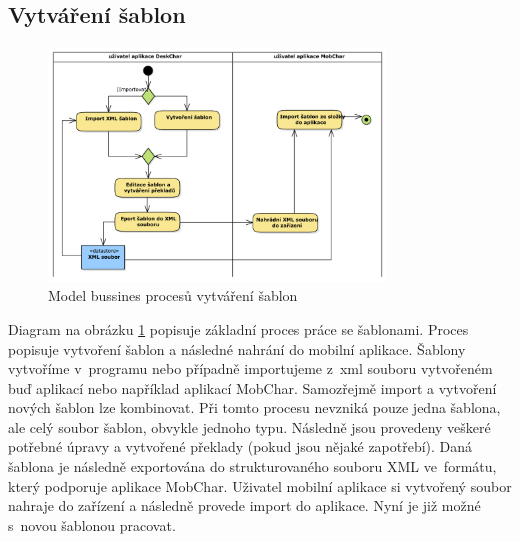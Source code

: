 \documentclass[thesis=B,czech]{resources/FITthesis}[2012/06/26]
\begin{document}
\subsection{Vytváření šablon} \label{sec:vytvareni_sablon}
\begin{figure}\centering
	\includegraphics[width=0.8\textwidth]{images/bussiness_sablony}
	\caption[Business proces vytváření šablon]{Model bussines procesů vytváření šablon}\label{fig:bp_sablony}
\end{figure}
Diagram na obrázku \ref{fig:bp_sablony} popisuje základní proces práce se šablonami. Proces popisuje vytvoření šablon a následné nahrání do mobilní aplikace. Šablony vytvoříme v~programu nebo případně importujeme z~xml souboru vytvořeném buď aplikací nebo například aplikací MobChar. Samozřejmě import a vytvoření nových šablon lze kombinovat. Při tomto procesu nevzniká pouze jedna šablona, ale celý soubor šablon, obvykle jednoho typu. Následně jsou provedeny veškeré potřebné úpravy a vytvořené překlady (pokud jsou nějaké zapotřebí). Daná šablona je následně exportována do strukturovaného souboru XML ve~formátu, který podporuje aplikace MobChar. Uživatel mobilní aplikace si vytvořený soubor nahraje do zařízení a následně provede import do aplikace. Nyní je již možné s~novou šablonou pracovat.
\end{document}

